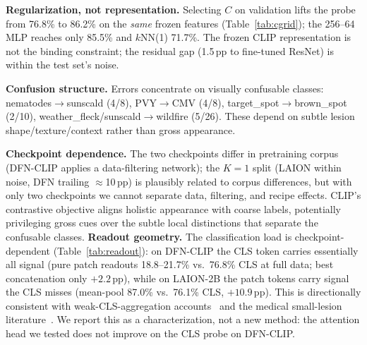 \documentclass[10pt,a4paper]{article}
\begin{document}
\textbf{Regularization, not representation.} Selecting $C$ on validation lifts the probe from 76.8\% to 86.2\% on the \emph{same} frozen features (Table~\ref{tab:cgrid}); the 256--64 MLP reaches only 85.5\% and $k$NN(1) 71.7\%. The frozen CLIP representation is not the binding constraint; the residual gap (1.5\,pp to fine-tuned ResNet) is within the test set's noise.

\textbf{Confusion structure.} Errors concentrate on visually confusable classes: nematodes$\to$sunscald (4/8), PVY$\to$CMV (4/8), target\_spot$\to$brown\_spot (2/10), weather\_fleck/sunscald$\to$wildfire (5/26). These depend on subtle lesion shape/texture/context rather than gross appearance.

\textbf{Checkpoint dependence.} The two checkpoints differ in pretraining corpus (DFN-CLIP applies a data-filtering network); the $K{=}1$ split (LAION within noise, DFN trailing $\approx$10\,pp) is plausibly related to corpus differences, but with only two checkpoints we cannot separate data, filtering, and recipe effects. CLIP's contrastive objective aligns holistic appearance with coarse labels, potentially privileging gross cues over the subtle local distinctions that separate the confusable classes.
\textbf{Readout geometry.} The classification load is checkpoint-dependent (Table~\ref{tab:readout}): on DFN-CLIP the CLS token carries essentially all signal (pure patch readouts 18.8--21.7\% vs.\ 76.8\% CLS at full data; best concatenation only $+2.2$\,pp), while on LAION-2B the patch tokens carry signal the CLS misses (mean-pool 87.0\% vs.\ 76.1\% CLS, $+10.9$\,pp). This is directionally consistent with weak-CLS-aggregation accounts~\cite{shi2026registers} and the medical small-lesion literature~\cite{cxr2026frozen,dinov3mil2026,traceclip2026}. We report this as a characterization, not a new method: the attention head we tested does not improve on the CLS probe on DFN-CLIP.
\end{document}
